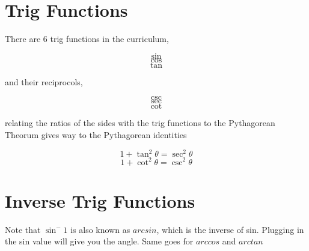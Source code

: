 \documentclass[../main.tex]{subfiles}
\begin{document}
\section{Trig Functions}

There are 6 trig functions in the curriculum,

\[ \sin \]
\[ \cos \]
\[ \tan \]

and their reciprocols,

\[ \csc \]
\[ \sec \]
\[ \cot \]

relating the ratios of the sides with the trig functions to the Pythagorean Theorum gives way to the Pythagorean identities

\[ 1 + \tan^2 \theta  = \sec^2 \theta \]
\[ 1 + \cot^2 \theta = \csc^2 \theta \]

\section{Inverse Trig Functions}

Note that $\sin^-1$ is also known as $arcsin$, which is the inverse of sin. Plugging in the sin value will give you the angle. Same goes for $arccos$ and $arctan$ 
\end{document}
